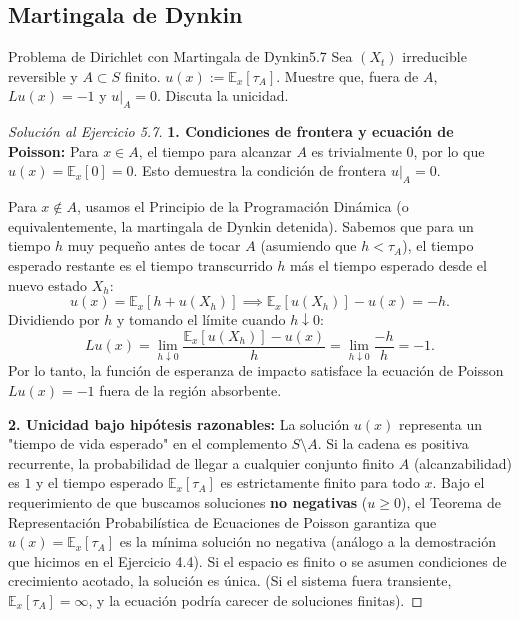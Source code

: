 \documentclass[10pt,a4paper]{article}
\begin{document}
\newpage
\subsection{Martingala de Dynkin}

\begin{ejercicio}{Problema de Dirichlet con Martingala de Dynkin}{5.7}
    Sea $(X_t)$ irreducible reversible y $A \subset S$ finito. $u(x) := \mathbb{E}_x[\tau_A]$. Muestre que, fuera de $A$, $Lu(x) = -1$ y $u|_A = 0$. Discuta la unicidad.
\end{ejercicio}

\begin{proof}[Solución al Ejercicio 5.7]
    \textbf{1. Condiciones de frontera y ecuación de Poisson:}
    Para $x \in A$, el tiempo para alcanzar $A$ es trivialmente $0$, por lo que $u(x) = \mathbb{E}_x[0] = 0$. Esto demuestra la condición de frontera $u|_A = 0$.
    
    Para $x \notin A$, usamos el Principio de la Programación Dinámica (o equivalentemente, la martingala de Dynkin detenida). Sabemos que para un tiempo $h$ muy pequeño antes de tocar $A$ (asumiendo que $h < \tau_A$), el tiempo esperado restante es el tiempo transcurrido $h$ más el tiempo esperado desde el nuevo estado $X_h$:
    \[ u(x) = \mathbb{E}_x[h + u(X_h)] \implies \mathbb{E}_x[u(X_h)] - u(x) = -h. \]
    Dividiendo por $h$ y tomando el límite cuando $h \downarrow 0$:
    \[ Lu(x) = \lim_{h \downarrow 0} \frac{\mathbb{E}_x[u(X_h)] - u(x)}{h} = \lim_{h \downarrow 0} \frac{-h}{h} = -1. \]
    Por lo tanto, la función de esperanza de impacto satisface la ecuación de Poisson $Lu(x) = -1$ fuera de la región absorbente.

    \textbf{2. Unicidad bajo hipótesis razonables:}
    La solución $u(x)$ representa un "tiempo de vida esperado" en el complemento $S \setminus A$. Si la cadena es positiva recurrente, la probabilidad de llegar a cualquier conjunto finito $A$ (alcanzabilidad) es $1$ y el tiempo esperado $\mathbb{E}_x[\tau_A]$ es estrictamente finito para todo $x$. 
    Bajo el requerimiento de que buscamos soluciones \textbf{no negativas} ($u \ge 0$), el Teorema de Representación Probabilística de Ecuaciones de Poisson garantiza que $u(x) = \mathbb{E}_x[\tau_A]$ es la mínima solución no negativa (análogo a la demostración que hicimos en el Ejercicio 4.4). Si el espacio es finito o se asumen condiciones de crecimiento acotado, la solución es única. (Si el sistema fuera transiente, $\mathbb{E}_x[\tau_A] = \infty$, y la ecuación podría carecer de soluciones finitas).
\end{proof}
\end{document}
